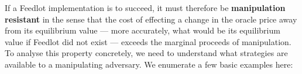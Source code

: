 \documentclass[a4paper,10pt]{article}
\theoremstyle{remark}
\newtheorem*{example}{Example}
\begin{document}
If a Feedlot implementation is to succeed, it must therefore be \textbf{manipulation resistant} in the sense that the cost of effecting a change in the oracle price away from its equilibrium value --- more accurately, what would be its equilibrium value if Feedlot did not exist --- exceeds the marginal proceeds of manipulation.
%
To analyse this property concretely, we need to understand what strategies are available to a manipulating adversary.
%
We enumerate a few basic examples here:

\end{document}
